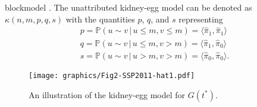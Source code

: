 \documentclass[10pt,journal,compsoc]{IEEEtran}
\theoremstyle{definition}
\begin{document}
blockmodel \cite{airoldi08:_mixed}. The unattributed kidney-egg model
can be denoted as $\kappa(n,m,p,q,s)$ with the quantities $p$, $q$,
and $s$ representing
\begin{gather*}
p = \mathbb{P}(u \sim v \, | \, u \leq m, v \leq m) = \langle
\hat{\pi}_1, \hat{\pi}_1 \rangle \\ q =
\mathbb{P}(u \sim v \, | \, u \leq m, v > m) = \langle \hat{\pi}_1,
\hat{\pi}_0 \rangle \\ s = \mathbb{P}(u
\sim v \, | \, u > m, v > m) = \langle \hat{\pi}_0, \hat{\pi}_0
\rangle . 
\end{gather*}
\begin{figure}[!tp]
  \centering
  \texttt{[image: graphics/Fig2-SSP2011-hat1.pdf]}
  \caption{An illustration of the kidney-egg model for $G(t^{*})$.}
  \label{fig:kidney-egg}
\end{figure}
\end{document}

